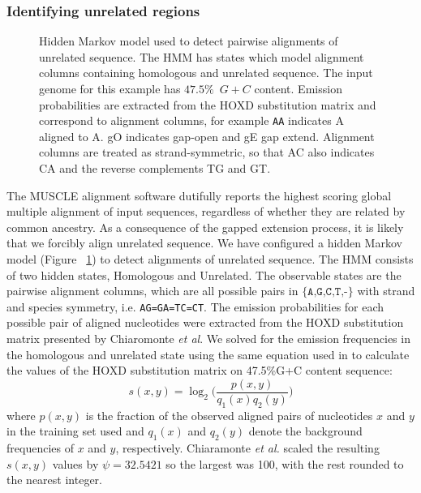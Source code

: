 \documentclass{llncs}
\begin{document}
\subsubsection{Identifying unrelated regions}
\begin{figure}[t]
\centering {}
\caption{Hidden Markov model used to detect pairwise alignments of unrelated
sequence. The HMM has states which model alignment columns containing
homologous and unrelated sequence. The input genome for this example has $47.5\%$~$G+C$ content. Emission probabilities are extracted from the HOXD substitution matrix and correspond to alignment
columns, for example \texttt{AA} indicates A aligned to A.  gO
indicates gap-open and gE gap extend. Alignment columns are treated as
strand-symmetric, so that AC also indicates CA and the reverse
complements TG and GT.}
\label{fig-hmm}\vspace{-0.2cm}
\end{figure}
The MUSCLE alignment software dutifully reports the highest scoring
global multiple alignment of input sequences, regardless of whether
they are related by common ancestry. As a consequence of the gapped
extension process, it is likely that we forcibly align unrelated
sequence. We have configured a hidden Markov model (Figure
~\ref{fig-hmm}) to detect alignments of unrelated sequence. The HMM
consists of two hidden states, Homologous and Unrelated. The
observable states are the pairwise alignment columns, which are all
possible pairs in $\texttt{{\{A,G,C,T,-\}}}$ with strand and species
symmetry, i.e. \texttt{AG=GA=TC=CT}. The emission probabilities for
each possible pair of aligned nucleotides were extracted from the HOXD
substitution matrix presented by Chiaromonte \textit{et al}\cite{hoxd}.
We solved for the emission frequencies in the
homologous and unrelated state using the same equation used in to
calculate the values of the HOXD substitution matrix on 47.5\%G+C
content sequence\cite{hoxd}:
\begin{equation}
s(x,y)= \log_{2}{\Bigg(\frac{p(x,y)}{q_{1}(x)q_{2}(y)}\Bigg)}
\end{equation}
{w}here $p(x,y)$ is the fraction of the observed aligned pairs of
nucleotides $x$ and $y$ in the training set used and $q_{1}(x)$ and
$q_{2}(y)$ denote the background frequencies of $x$ and $y$,
respectively. Chiaramonte \textit{et al.} scaled the resulting
$s(x,y)$ values by $\psi=32.5421$ so the largest was 100,
with the rest rounded to the nearest integer.
\end{document}
